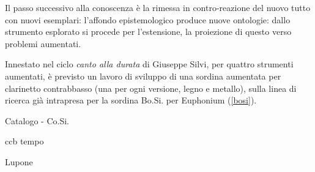 \documentclass{gs-adonis}
\begin{document}





Il passo successivo alla conoscenza è la rimessa in contro-reazione del nuovo
tutto con nuovi esemplari: l'affondo epistemologico produce nuove ontologie:
dallo strumento esplorato si procede per l'estensione, la proiezione di questo
verso problemi aumentati.

Innestato nel ciclo \emph{canto alla durata} di Giuseppe Silvi, per quattro
strumenti aumentati, è previsto un lavoro di sviluppo di una sordina aumentata
per clarinetto contrabbasso (una per ogni versione, legno e metallo), sulla
linea di ricerca già intrapresa per la sordina Bo.Si. per Euphonium (\ref{bosi}).

\begin{description}
  \item[Catalogo - Co.Si.]
\end{description}

\begin{description}
  \item[ccb tempo]
\end{description}

\begin{description}
  \item[Lupone]
\end{description}





\end{document}
